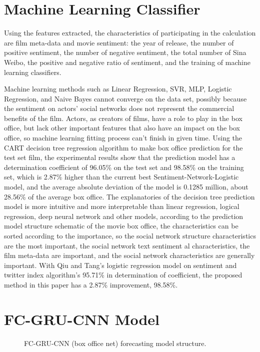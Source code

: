 \documentclass[review]{cvpr}
\begin{document}
\section{Machine Learning Classifier}

Using the features extracted, the characteristics of participating in the calculation are film meta-data and movie sentiment: the year of release, the number of positive sentiment, the number of negative sentiment, the total number of Sina Weibo, the positive and negative ratio of sentiment, and the training of machine learning classifiers.

Machine learning methods such as Linear Regression, SVR, MLP, Logistic Regression, and Naive Bayes cannot converge on the data set, possibly because the sentiment on actors' social networks does not represent the commercial benefits of the film.
Actors, as creators of films, have a role to play in the box office, but lack other important features that also have an impact on the box office, so machine learning fitting process can't finish in given time.
Using the CART decision tree regression algorithm to make box office prediction for the test set film, 
the experimental results show that the prediction model has a determination coefficient of 96.05\% on the test set and 98.58\% on the training set, which is 2.87\% higher than the current best Sentiment-Network-Logistic model, 
and the average absolute deviation of the model is 0.1285 million, about 28.56\% of the average box office.
The explanatories of the decision tree prediction model is more intuitive and more interpretable than linear regression, logical regression, deep neural network and other models, according to the prediction model structure schematic of the movie box office, 
the characteristics can be sorted according to the importance, so the social network structure characteristics are the most important, the social network text sentiment al characteristics, the film meta-data are important, and the social network characteristics are generally important.
With Qiu and Tang's logistic regression model on sentiment and twitter index algorithm's 95.71\% in determination of coefficient, the proposed method in this paper has a 2.87\% improvement, 98.58\%.

\section{FC-GRU-CNN Model}


\begin{figure*}
\begin{center}
\end{center}
   \caption{FC-GRU-CNN (box office net) forecasting model structure.}
\label{fig:short}
\end{figure*}
\end{document}
